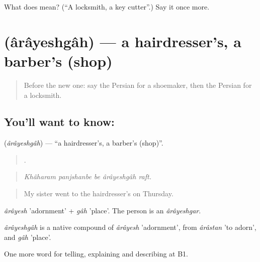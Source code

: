 \begin{tcolorbox}[breakable,colback=teal!4,colframe=teal!35!black,title={Before you move on}]
What does   mean? (\textquotedblleft{}A locksmith, a key cutter\textquotedblright{}.) Say it once more.
\end{tcolorbox}
\section[\texorpdfstring{\fa{آرایشگاه} (ârâyeshgâh)}{آرایشگاه (ârâyeshgâh)}]{ (ârâyeshgâh) — a hairdresser's, a barber's (shop)}

\label{lesson:FA-C454-arayeshgah}



\begin{quote}
Before the new one: say the Persian for a shoemaker, then the Persian for a locksmith.
\end{quote}

\subsection*{You'll want to know: }
\textbf{} (\emph{ârâyeshgâh}) — \textquotedblleft{}a hairdresser's, a barber's (shop)\textquotedblright{}.

\begin{quote}
    .
\end{quote}

\begin{quote}
\emph{Khâharam panjshanbe be ârâyeshgâh raft.}
\end{quote}

\begin{quote}
My sister went to the hairdresser's on Thursday.
\end{quote}

\emph{ârâyesh} 'adornment' + \emph{gâh} 'place'. The person is an \emph{ârâyeshgar}.

\begin{cousinweb}
\emph{ârâyeshgâh} is a native compound of \emph{ârâyesh} 'adornment', from \emph{ârâstan} 'to adorn', and \emph{gâh} 'place'.
\end{cousinweb}

\begin{grammarlens}[title={What you've built}]
One more word for telling, explaining and describing at B1.
\end{grammarlens}

